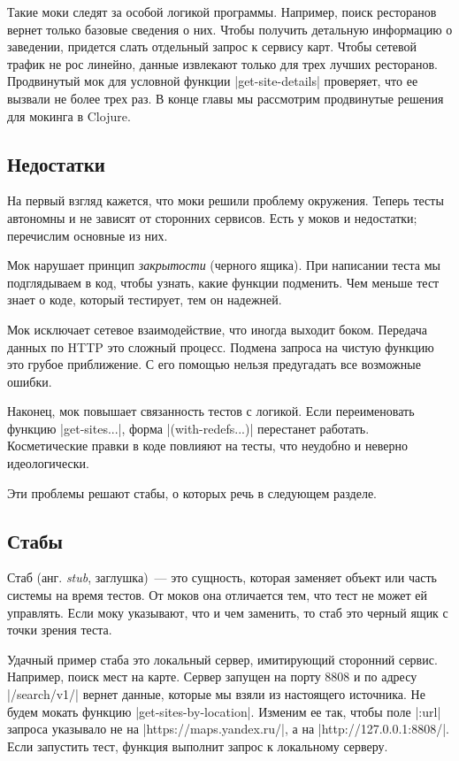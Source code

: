 Такие моки следят за особой логикой программы. Например, поиск ресторанов вернет
только базовые сведения о них. Чтобы получить детальную информацию о заведении,
придется слать отдельный запрос к сервису карт. Чтобы сетевой трафик не рос
линейно, данные извлекают только для трех лучших ресторанов. Продвинутый мок для
условной функции \spverb|get-site-details| проверяет, что ее вызвали не более
трех раз. В конце главы мы рассмотрим продвинутые решения для мокинга в Clojure.

\subsection{Недостатки}

На первый взгляд кажется, что моки решили проблему окружения. Теперь тесты
автономны и не зависят от сторонних сервисов. Есть у моков и недостатки;
перечислим основные из них.

Мок нарушает принцип \emph{закрытости} (черного ящика). При написании теста мы
подглядываем в код, чтобы узнать, какие функции подменить. Чем меньше тест знает
о коде, который тестирует, тем он надежней.

Мок исключает сетевое взаимодействие, что иногда выходит боком. Передача данных
по HTTP это сложный процесс. Подмена запроса на чистую функцию это грубое
приближение. С его помощью нельзя предугадать все возможные ошибки.

Наконец, мок повышает связанность тестов с логикой. Если переименовать функцию
\spverb|get-sites...|, форма \spverb|(with-redefs...)| перестанет
работать. Косметические правки в коде повлияют на тесты, что неудобно и неверно
идеологически.

Эти проблемы решают стабы, о которых речь в следующем разделе.

\subsection{Стабы}

Стаб (анг. \emph{stub}, заглушка)~--- это сущность, которая заменяет объект или
часть системы на время тестов. От моков она отличается тем, что тест не может ей
управлять. Если моку указывают, что и чем заменить, то стаб это черный ящик с
точки зрения теста.

Удачный пример стаба это локальный сервер, имитирующий сторонний сервис.
Например, поиск мест на карте. Сервер запущен на порту 8808 и по адресу
\spverb|/search/v1/| вернет данные, которые мы взяли из настоящего источника. Не
будем мокать функцию \spverb|get-sites-by-location|. Изменим ее так, чтобы поле
\spverb|:url| запроса указывало не на \spverb|https://maps.yandex.ru/|, а на
\spverb|http://127.0.0.1:8808/|. Если запустить тест, функция выполнит запрос к
локальному серверу.


